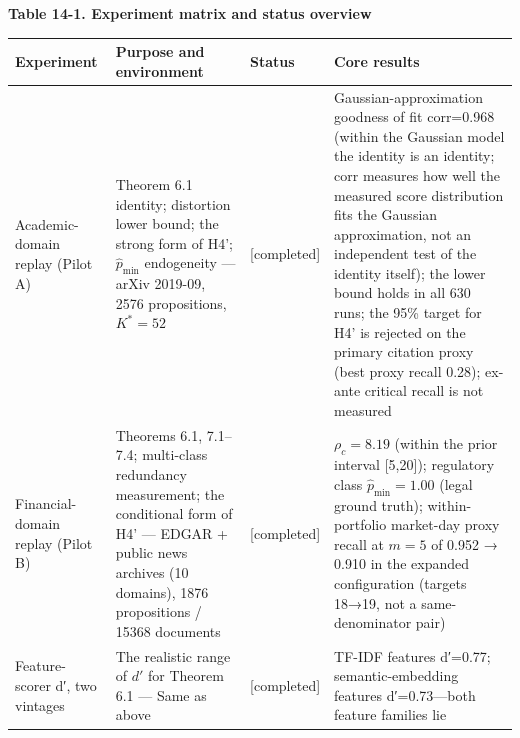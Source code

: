 \documentclass[
  11pt]{article}
\begin{document}
\textbf{Table 14-1. Experiment matrix and status overview}

\begin{longtable}[]{@{}
  >{\raggedright\arraybackslash}p{}
  >{\raggedright\arraybackslash}p{}
  >{\raggedright\arraybackslash}p{}
  >{\raggedright\arraybackslash}p{}@{}}
\toprule\noalign{}
\begin{minipage}[b]{\linewidth}\raggedright
Experiment
\end{minipage} & \begin{minipage}[b]{\linewidth}\raggedright
Purpose and environment
\end{minipage} & \begin{minipage}[b]{\linewidth}\raggedright
Status
\end{minipage} & \begin{minipage}[b]{\linewidth}\raggedright
Core results
\end{minipage} \\
\midrule\noalign{}
\endhead
\bottomrule\noalign{}
\endlastfoot
Academic-domain replay (Pilot A) & Theorem 6.1 identity; distortion
lower bound; the strong form of H4'; \(\hat p_{\min}\) endogeneity ---
arXiv 2019-09, 2576 propositions, \(K^*=52\) & {[}completed{]} &
Gaussian-approximation goodness of fit corr=0.968 (within the Gaussian
model the identity is an identity; corr measures how well the measured
score distribution fits the Gaussian approximation, not an independent
test of the identity itself); the lower bound holds in all 630 runs; the
95\% target for H4' is rejected on the primary citation proxy (best
proxy recall 0.28); ex-ante critical recall is not measured \\
Financial-domain replay (Pilot B) & Theorems 6.1, 7.1--7.4; multi-class
redundancy measurement; the conditional form of H4' --- EDGAR + public
news archives (10 domains), 1876 propositions / 15368 documents &
{[}completed{]} & \(\rho_c=8.19\) (within the prior interval
{[}5,20{]}); regulatory class \(\hat p_{\min}=1.00\) (legal ground
truth); within-portfolio market-day proxy recall at \(m{=}5\) of 0.952 →
0.910 in the expanded configuration (targets 18→19, not a
same-denominator pair) \\
Feature-scorer d′, two vintages & The realistic range of \(d'\) for
Theorem 6.1 --- Same as above & {[}completed{]} & TF-IDF features
d′=0.77; semantic-embedding features d′=0.73---both feature families lie

\end{longtable}
\end{document}
